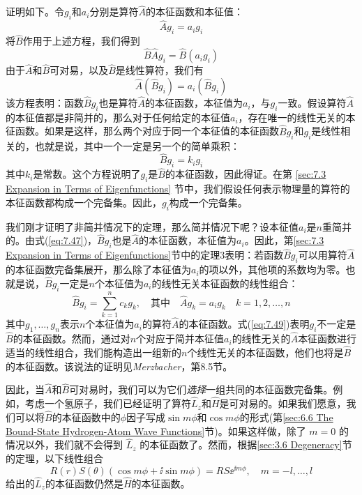     证明如下。令$g_i$和$a_i$分别是算符$\hat{A}$的本征函数和本征值：
    \begin{equation*}
        \hat{A}g_i = a_ig_i
    \end{equation*}
    将$\hat{B}$作用于上述方程，我们得到
    \begin{equation*}
        \hat{B}\hat{A}g_i = \hat{B}\left(a_ig_i\right)
    \end{equation*}
    由于$\hat{A}$和$\hat{B}$可对易，以及$\hat{B}$是线性算符，我们有
    \begin{equation}
        \hat{A}\left(\hat{B}g_i\right) = a_i\left(\hat{B}g_i\right)
        \label{eq:7.47}
    \end{equation}
    该方程表明：函数$\hat{B}g_i$也是算符$\hat{A}$的本征函数，本征值为$a_i$，与$g_i$一致。假设算符$\hat{A}$的本征值都是非简并的，那么对于任何给定的本征值$a_i$，存在唯一的线性无关的本征函数。如果是这样，那么两个对应于同一个本征值的本征函数$\hat{B}g_i$和$g_i$是线性相关的，也就是说，其中一个一定是另一个的简单乘积：
    \begin{equation}
        \hat{B}g_i = k_ig_i
        \label{eq:7.48}
    \end{equation}
    其中$k_i$是常数。这个方程说明了$g_i$是$\hat{B}$的本征函数，因此得证。在第 \ref{sec:7.3 Expansion in Terms of Eigenfunctions} 节中，我们假设任何表示物理量的算符的本征函数都构成一个完备集。因此，$g_i$构成一个完备集。

    我们刚才证明了非简并情况下的定理，那么简并情况下呢？设本征值$a_i$是$n$重简并的。由式(\ref{eq:7.47})，$\hat{B}g_i$也是$\hat{A}$的本征函数，本征值为$a_i$。因此，第\ref{sec:7.3 Expansion in Terms of Eigenfunctions}节中的定理3表明：若函数$\hat{B}g_i$可以用算符$\hat{A}$的本征函数完备集展开，那么除了本征值为$a_i$的项以外，其他项的系数均为零。也就是说，$\hat{B}g_i$一定是$n$个本征值为$a_i$的线性无关本征函数的线性组合：
    \begin{equation}
        \hat{B}g_i = \sum_{k=1}^{n}c_kg_k, \quad \text{其中} \quad \hat{A}g_k = a_ig_k \quad k = 1,2,\ldots,n
        \label{eq:7.49}
    \end{equation}
    其中$g_1,\ldots,g_n$表示$n$个本征值为$a_i$的算符$\hat{A}$的本征函数。式(\ref{eq:7.49})表明$g_i$不一定是$\hat{B}$的本征函数。然而，通过对$n$个对应于简并本征值$a_i$的线性无关的$\hat{A}$本征函数进行适当的线性组合，我们能构造出一组新的$n$个线性无关的本征函数，他们也将是$\hat{B}$的本征函数。该说法的证明见\textit{Merzbacher}，第8.5节。

    因此，当$\hat{A}$和$\hat{B}$可对易时，我们可以为它们\textit{选择}一组共同的本征函数完备集。例如，考虑一个氢原子，我们已经证明了算符$\hat{L}_z$和$\hat{H}$是可对易的。如果我们愿意，我们可以将$\hat{B}$的本征函数中的$\phi$因子写成$\sin m\phi$和$\cos m\phi$的形式(第\ref{sec:6.6 The Bound-State Hydrogen-Atom Wave Functions}节)。如果这样做，除了 $m=0$ 的情况以外，我们就不会得到 $\hat{L}_z$ 的本征函数了。然而，根据\ref{sec:3.6 Degeneracy}节的定理，以下线性组合
    \begin{equation*}
        R\left(r\right)S\left(\theta\right)\left(\cos m\phi+\ii \sin m\phi\right) = RS\ee ^{\ii m\phi}, \quad m = -l,\ldots,l
    \end{equation*}
    给出的$\hat{L}_z$的本征函数仍然是$\hat{H}$的本征函数。

